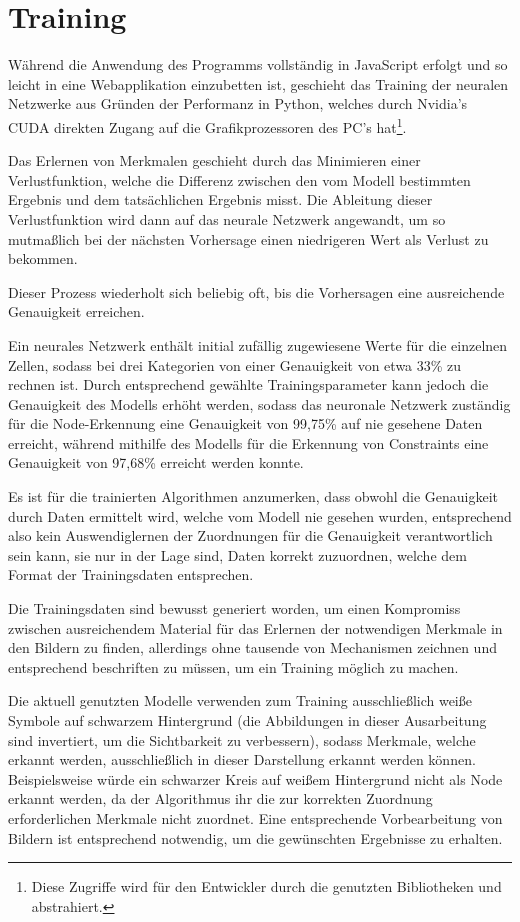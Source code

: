 \section{Training}
Während die Anwendung des Programms vollständig in JavaScript erfolgt und so leicht in eine Webapplikation einzubetten ist, geschieht das Training der neuralen Netzwerke aus Gründen der Performanz in Python, welches durch Nvidia's CUDA\cite{nvidia2019} direkten Zugang auf die Grafikprozessoren des PC's hat\footnote{Diese Zugriffe wird für den Entwickler durch die genutzten Bibliotheken  und  abstrahiert.}.

Das Erlernen von Merkmalen geschieht durch das Minimieren einer Verlustfunktion, welche die Differenz zwischen den vom Modell bestimmten Ergebnis und dem tatsächlichen Ergebnis misst.
Die Ableitung dieser Verlustfunktion wird dann auf das neurale Netzwerk angewandt, um so mutma{\ss}lich bei der nächsten Vorhersage einen niedrigeren Wert als Verlust zu bekommen.

Dieser Prozess wiederholt sich beliebig oft, bis die Vorhersagen eine ausreichende Genauigkeit erreichen.

Ein neurales Netzwerk enthält initial zufällig zugewiesene Werte für die einzelnen Zellen, sodass bei drei Kategorien von einer Genauigkeit von etwa 33\% zu rechnen ist.
Durch entsprechend gewählte Trainingsparameter kann jedoch die Genauigkeit des Modells erhöht werden, sodass das neuronale Netzwerk zuständig für die Node-Erkennung eine Genauigkeit von 99,75\% auf nie gesehene Daten erreicht, während mithilfe des Modells für die Erkennung von Constraints eine Genauigkeit von 97,68\% erreicht werden konnte.

Es ist für die trainierten Algorithmen anzumerken, dass obwohl die Genauigkeit durch Daten ermittelt wird, welche vom Modell nie gesehen wurden, entsprechend also kein Auswendiglernen der Zuordnungen\cite[p.705]{StuartRussell2018} für die Genauigkeit verantwortlich sein kann, sie nur in der Lage sind, Daten korrekt zuzuordnen, welche dem Format der Trainingsdaten entsprechen.

Die Trainingsdaten sind bewusst generiert worden, um einen Kompromiss zwischen ausreichendem Material für das Erlernen der notwendigen Merkmale in den Bildern zu finden, allerdings ohne tausende von Mechanismen zeichnen und entsprechend beschriften zu müssen, um ein Training möglich zu machen.

Die aktuell genutzten Modelle verwenden zum Training ausschlie{\ss}lich wei{\ss}e Symbole auf schwarzem Hintergrund (die Abbildungen in dieser Ausarbeitung sind invertiert, um die Sichtbarkeit zu verbessern), sodass Merkmale, welche erkannt werden, ausschlie{\ss}lich in dieser Darstellung erkannt werden können. Beispielsweise würde ein schwarzer Kreis auf wei{\ss}em Hintergrund nicht als Node erkannt werden, da der Algorithmus ihr die zur korrekten Zuordnung erforderlichen Merkmale nicht zuordnet.
Eine entsprechende Vorbearbeitung von Bildern ist entsprechend notwendig, um die gewünschten Ergebnisse zu erhalten.
